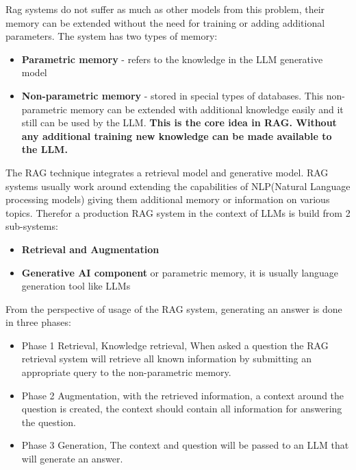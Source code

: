 \documentclass{wseas}
\begin{document}
Rag systems do not suffer as much as other models from this problem,
their memory can be extended without the need for training or adding
additional parameters. The system has two types of memory:

\begin{itemize}

\item
  \textbf{Parametric memory} - refers to the knowledge in the LLM
  generative model
\item
  \textbf{Non-parametric memory} - stored in special types of databases.
  This non-parametric memory can be extended with additional knowledge
  easily and it still can be used by the LLM. \textbf{This is the core
  idea in RAG. Without any additional training new knowledge can be made
  available to the LLM.}
\end{itemize}

The RAG technique integrates a retrieval model and generative model. RAG
systems usually work around extending the capabilities of NLP(Natural
Language processing models) giving them additional memory or information
on various topics. Therefor a production RAG system in the context of
LLMs is build from 2 sub-systems:

\begin{itemize}

\item
  \textbf{Retrieval and Augmentation}
\item
  \textbf{Generative AI component} or parametric memory, it is usually
  language generation tool like LLMs
\end{itemize}


From the perspective of usage of the RAG system, generating an answer is
done in three phases:

\begin{itemize}

\item
  Phase 1 Retrieval, Knowledge retrieval, When asked a question the RAG
  retrieval system will retrieve all known information by submitting an
  appropriate query to the non-parametric memory.
\item
  Phase 2 Augmentation, with the retrieved information, a context around
  the question is created, the context should contain all information
  for answering the question.
\item
  Phase 3 Generation, The context and question will be passed to an LLM
  that will generate an answer.
\end{itemize}
\end{document}
